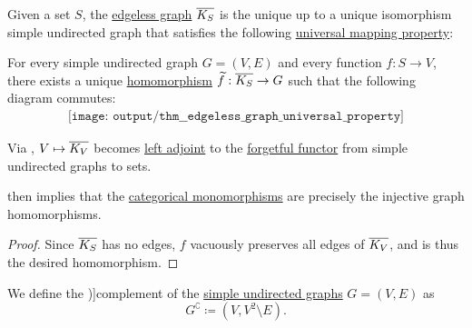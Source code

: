 \begin{theorem}\label{thm:edgeless_graph_universal_property}
  Given a set \( S \), the \hyperref[def:edgeless_graph]{edgeless graph} \( \oline{K_S} \) is the unique up to a unique isomorphism simple undirected graph that satisfies the following \hyperref[rem:universal_mapping_property]{universal mapping property}:
  \begin{displayquote}
    For every simple undirected graph \( G = (V, E) \) and every function \( f: S \to V \), there exists a unique \hyperref[def:undirected_graph/homomorphism]{homomorphism} \( \widetilde{f}: \oline{K_S} \to G \) such that the following diagram commutes:
    \begin{equation}\label{eq:thm:edgeless_graph_universal_property/diagram}
      \begin{aligned}
        \texttt{[image: output/thm\_\_edgeless\_graph\_universal\_property]}
      \end{aligned}
    \end{equation}
  \end{displayquote}
\end{theorem}
\begin{comments}
  \item Via , \( V \mapsto \oline{K_V} \) becomes \hyperref[def:category_adjunction]{left adjoint} to the \hyperref[def:concrete_category]{forgetful functor} from simple undirected graphs to sets.

   then implies that the \hyperref[def:morphism_invertibility/left_cancellative]{categorical monomorphisms} are precisely the injective graph homomorphisms.
\end{comments}
\begin{proof}
  Since \( \oline{K_S} \) has no edges, \( f \) vacuously preserves all edges of \( \oline{K_V} \), and is thus the desired homomorphism.
\end{proof}

\begin{definition}\label{def:graph_complement}
  We define the \term[ru=дополнение (\cite[15]{Емеличев1990})]{complement} of the \hyperref[def:undirected_graph]{simple undirected graphs} \( G = (V, E) \) as
  \begin{equation*}
     G^{\complement} \coloneqq (V, V^2 \setminus E).
  \end{equation*}
\end{definition}

